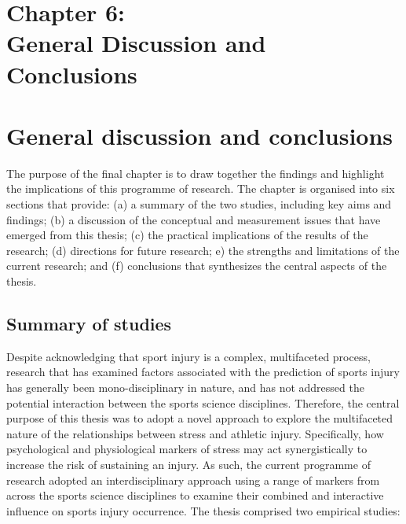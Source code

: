\documentclass[
  english,
  man,floatsintext]{apa6}
\begin{document}
\vspace*{3cm}

\section[Chapter 6: General discussion and conclusions]{\Large{Chapter 6: \\ General Discussion and Conclusions}}

\clearpage

\hypertarget{general-discussion-and-conclusions}{%
\section{General discussion and conclusions}\label{general-discussion-and-conclusions}}

The purpose of the final chapter is to draw together the findings and highlight the implications of this programme of research.
The chapter is organised into six sections that provide: (a) a summary of the two studies, including key aims and findings; (b) a discussion of the conceptual and measurement issues that have emerged from this thesis; (c) the practical implications of the results of the research; (d) directions for future research; e) the strengths and limitations of the current research; and (f) conclusions that synthesizes the central aspects of the thesis.

\hypertarget{summary-of-studies}{%
\subsection{Summary of studies}\label{summary-of-studies}}

Despite acknowledging that sport injury is a complex, multifaceted process, research that has examined factors associated with the prediction of sports injury has generally been mono-disciplinary in nature, and has not addressed the potential interaction between the sports science disciplines.
Therefore, the central purpose of this thesis was to adopt a novel approach to explore the multifaceted nature of the relationships between stress and athletic injury.
Specifically, how psychological and physiological markers of stress may act synergistically to increase the risk of sustaining an injury.
As such, the current programme of research adopted an interdisciplinary approach using a range of markers from across the sports science disciplines to examine their combined and interactive influence on sports injury occurrence. The thesis comprised two empirical studies:
\end{document}
